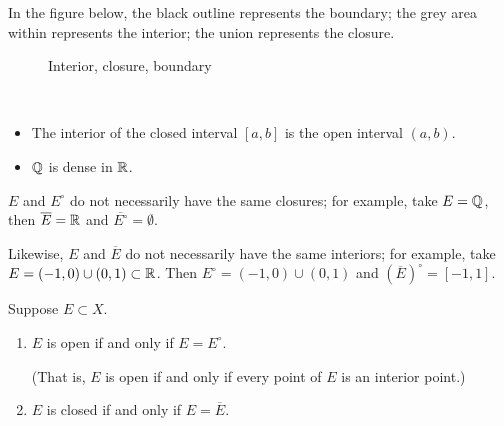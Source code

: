 In the figure below, the black outline represents the boundary; the grey area within represents the interior; the union represents the closure.
\begin{figure}[H]
\centering
{}
\caption{Interior, closure, boundary}
\end{figure}

\begin{example} \
\begin{itemize}
\item The interior of the closed interval $[a,b]$ is the open interval $(a,b)$.
\item $\mathbb Q$ is dense in $\mathbb R$.
\end{itemize}
\end{example}

\begin{remark}
$E$ and $E^\circ$ do not necessarily have the same closures; for example, take $E=\mathbb Q$, then $\overline{E}=\mathbb R$ and $\overline{E^\circ}=\emptyset$.

Likewise, $E$ and $\overline{E}$ do not necessarily have the same interiors; for example, take $E=(-1,0)\cup(0,1)\subset\mathbb R$. Then $E^\circ=(-1,0)\cup(0,1)$ and $(\overline{E})^\circ=[-1,1]$.
\end{remark}

\begin{lemma}
Suppose $E\subset X$.
\begin{enumerate}[label=(\roman*)]
\item $E$ is open if and only if $E=E^\circ$.

(That is, $E$ is open if and only if every point of $E$ is an interior point.)

\item $E$ is closed if and only if $E=\overline{E}$.
\end{enumerate}
\end{lemma}


